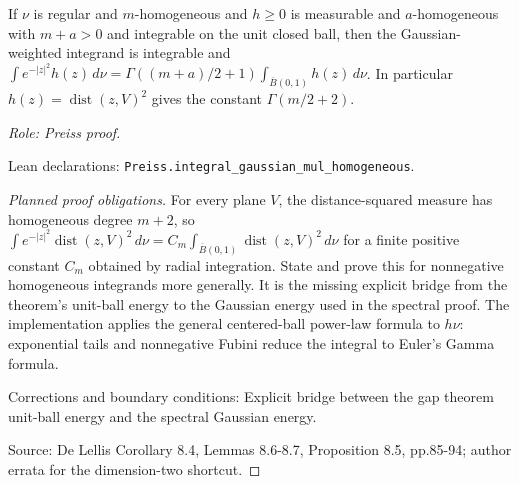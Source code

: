 \begin{lemma}
\label{lem:homogeneous-energy-radial}




If $\nu$ is regular and $m$-homogeneous and $h\geq0$ is measurable and $a$-homogeneous with $m+a>0$ and integrable on the unit closed ball, then the Gaussian-weighted integrand is integrable and $\int e^{-|z|^2}h(z)\,d\nu=\Gamma((m+a)/2+1)\int_{\overline B(0,1)}h(z)\,d\nu$. In particular $h(z)=\operatorname{dist}(z,V)^2$ gives the constant $\Gamma(m/2+2)$.
\par\emph{Role: Preiss proof.}
\par Lean declarations: \texttt{Preiss.integral\_gaussian\_mul\_homogeneous}.
\end{lemma}
\begin{proof}[Planned proof obligations]

For every plane $V$, the distance-squared measure has homogeneous degree
$m+2$, so
$\int e^{-|z|^2}\operatorname{dist}(z,V)^2\,d\nu
=C_m\int_{\overline B(0,1)}\operatorname{dist}(z,V)^2\,d\nu$
for a finite positive constant $C_m$ obtained by radial integration.
State and prove this for nonnegative homogeneous integrands more generally.
It is the missing explicit bridge from the theorem's unit-ball energy to the
Gaussian energy used in the spectral proof. The implementation applies the
general centered-ball power-law formula to $h\nu$: exponential tails and
nonnegative Fubini reduce the integral to Euler's Gamma formula.
\par Corrections and boundary conditions: Explicit bridge between the gap theorem unit-ball energy and the spectral Gaussian energy.
\par Source: De Lellis Corollary 8.4, Lemmas 8.6-8.7, Proposition 8.5, pp.85-94; author errata for the dimension-two shortcut.
\end{proof}

